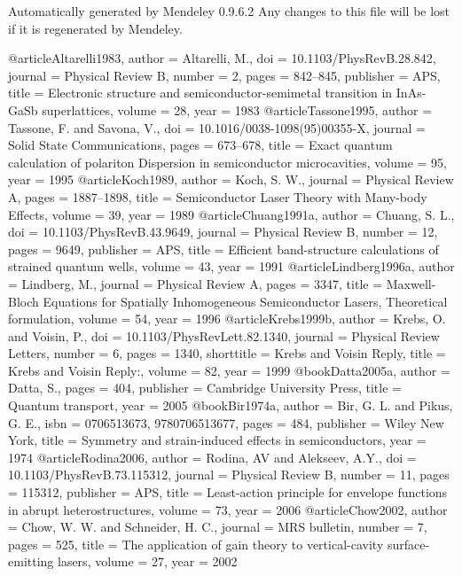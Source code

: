 Automatically generated by Mendeley 0.9.6.2
Any changes to this file will be lost if it is regenerated by Mendeley.

@article{Altarelli1983,
author = {Altarelli, M.},
doi = {10.1103/PhysRevB.28.842},
journal = {Physical Review B},
number = {2},
pages = {842--845},
publisher = {APS},
title = {{Electronic structure and semiconductor-semimetal transition in InAs-GaSb superlattices}},
volume = {28},
year = {1983}
}
@article{Tassone1995,
author = {Tassone, F. and Savona, V.},
doi = {10.1016/0038-1098(95)00355-X},
journal = {Solid State Communications},
pages = {673--678},
title = {{Exact quantum calculation of polariton Dispersion in semiconductor microcavities}},
volume = {95},
year = {1995}
}
@article{Koch1989,
author = {Koch, S. W.},
journal = {Physical Review A},
pages = {1887--1898},
title = {{Semiconductor Laser Theory with Many-body Effects}},
volume = {39},
year = {1989}
}
@article{Chuang1991a,
author = {Chuang, S. L.},
doi = {10.1103/PhysRevB.43.9649},
journal = {Physical Review B},
number = {12},
pages = {9649},
publisher = {APS},
title = {{Efficient band-structure calculations of strained quantum wells}},
volume = {43},
year = {1991}
}
@article{Lindberg1996a,
author = {Lindberg, M.},
journal = {Physical Review A},
pages = {3347},
title = {{Maxwell-Bloch Equations for Spatially Inhomogeneous Semiconductor Lasers, Theoretical formulation}},
volume = {54},
year = {1996}
}
@article{Krebs1999b,
author = {Krebs, O. and Voisin, P.},
doi = {10.1103/PhysRevLett.82.1340},
journal = {Physical Review Letters},
number = {6},
pages = {1340},
shorttitle = {Krebs and Voisin Reply},
title = {{Krebs and Voisin Reply:}},
volume = {82},
year = {1999}
}
@book{Datta2005a,
author = {Datta, S.},
pages = {404},
publisher = {Cambridge University Press},
title = {{Quantum transport}},
year = {2005}
}
@book{Bir1974a,
author = {Bir, G. L. and Pikus, G. E.},
isbn = {0706513673, 9780706513677},
pages = {484},
publisher = {Wiley New York},
title = {{Symmetry and strain-induced effects in semiconductors}},
year = {1974}
}
@article{Rodina2006,
author = {Rodina, AV and Alekseev, A.Y.},
doi = {10.1103/PhysRevB.73.115312},
journal = {Physical Review B},
number = {11},
pages = {115312},
publisher = {APS},
title = {{Least-action principle for envelope functions in abrupt heterostructures}},
volume = {73},
year = {2006}
}
@article{Chow2002,
author = {Chow, W. W. and Schneider, H. C.},
journal = {MRS bulletin},
number = {7},
pages = {525},
title = {{The application of gain theory to vertical-cavity surface-emitting lasers}},
volume = {27},
year = {2002}
}
